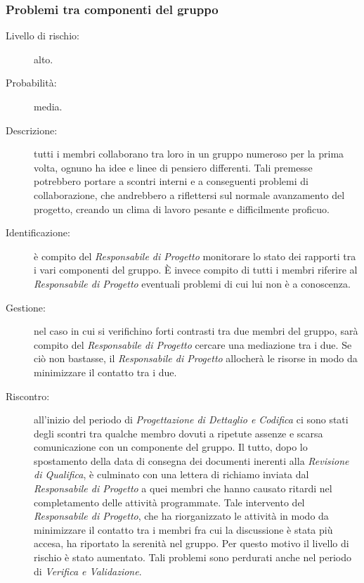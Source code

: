 \subsubsection{Problemi tra componenti del gruppo}
\label{rischi}
\begin{description}
	\item[Livello di rischio:] alto.
	\item[Probabilità:] media.
	\item[Descrizione:] tutti i membri collaborano tra loro in un gruppo numeroso per la prima volta, ognuno ha idee e linee di pensiero differenti.
	Tali premesse potrebbero portare a scontri interni e a conseguenti problemi di collaborazione, che andrebbero a riflettersi sul normale	avanzamento del progetto, creando un clima di lavoro pesante e difficilmente proficuo.
	\item[Identificazione:] è compito del \textit{Responsabile di Progetto} monitorare lo stato dei rapporti tra i vari componenti del gruppo. È invece compito di tutti i membri riferire al \textit{Responsabile di Progetto} eventuali problemi di cui lui non è a conoscenza.
	\item[Gestione:] nel caso in cui si verifichino forti contrasti tra due membri del gruppo, sarà compito del \textit{Responsabile di Progetto} cercare una mediazione tra i due. Se ciò non bastasse, il \textit{Responsabile di Progetto} allocherà le risorse in modo da minimizzare il contatto tra i due.
	\item[Riscontro:] all'inizio del periodo di \textit{Progettazione di Dettaglio e Codifica} ci sono stati degli scontri tra qualche membro dovuti a ripetute assenze e scarsa comunicazione con un componente del gruppo. Il tutto, dopo lo spostamento della data di consegna dei documenti inerenti alla \textit{Revisione di Qualifica}, è culminato con una lettera di richiamo inviata dal \textit{Responsabile di Progetto} a quei membri che hanno causato ritardi nel completamento delle attività programmate. Tale intervento del \textit{Responsabile di Progetto}, che ha riorganizzato le attività in modo da minimizzare il contatto tra i membri fra cui la discussione è stata più accesa, ha riportato la serenità nel gruppo. Per questo motivo il livello di rischio è stato aumentato. Tali problemi sono perdurati anche nel periodo di \textit{Verifica e Validazione}. 
\end{description}

